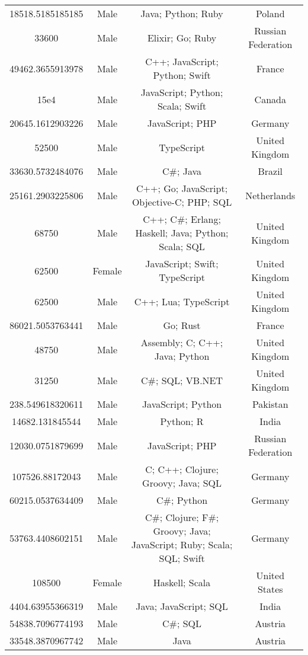 \begin{center}
\begin{tabular}{ |c|c|c|c| }
18518.5185185185  &  Male  &  Java; Python; Ruby  &  Poland  \\ 
33600  &  Male  &  Elixir; Go; Ruby  &  Russian Federation  \\ 
49462.3655913978  &  Male  &  C++; JavaScript; Python; Swift  &  France  \\ 
15e4  &  Male  &  JavaScript; Python; Scala; Swift  &  Canada  \\ 
20645.1612903226  &  Male  &  JavaScript; PHP  &  Germany  \\ 
52500  &  Male  &  TypeScript  &  United Kingdom  \\ 
33630.5732484076  &  Male  &  C\#; Java  &  Brazil  \\ 
25161.2903225806  &  Male  &  C++; Go; JavaScript; Objective-C; PHP; SQL  &  Netherlands  \\ 
68750  &  Male  &  C++; C\#; Erlang; Haskell; Java; Python; Scala; SQL  &  United Kingdom  \\ 
62500  &  Female  &  JavaScript; Swift; TypeScript  &  United Kingdom  \\ 
62500  &  Male  &  C++; Lua; TypeScript  &  United Kingdom  \\ 
86021.5053763441  &  Male  &  Go; Rust  &  France  \\ 
48750  &  Male  &  Assembly; C; C++; Java; Python  &  United Kingdom  \\ 
31250  &  Male  &  C\#; SQL; VB.NET  &  United Kingdom  \\ 
238.549618320611  &  Male  &  JavaScript; Python  &  Pakistan  \\ 
14682.131845544  &  Male  &  Python; R  &  India  \\ 
12030.0751879699  &  Male  &  JavaScript; PHP  &  Russian Federation  \\ 
107526.88172043  &  Male  &  C; C++; Clojure; Groovy; Java; SQL  &  Germany  \\ 
60215.0537634409  &  Male  &  C\#; Python  &  Germany  \\ 
53763.4408602151  &  Male  &  C\#; Clojure; F\#; Groovy; Java; JavaScript; Ruby; Scala; SQL; Swift  &  Germany  \\ 
108500  &  Female  &  Haskell; Scala  &  United States  \\ 
4404.63955366319  &  Male  &  Java; JavaScript; SQL  &  India  \\ 
54838.7096774193  &  Male  &  C\#; SQL  &  Austria  \\ 
33548.3870967742  &  Male  &  Java  &  Austria  \\ 

\end{tabular}
\end{center}
